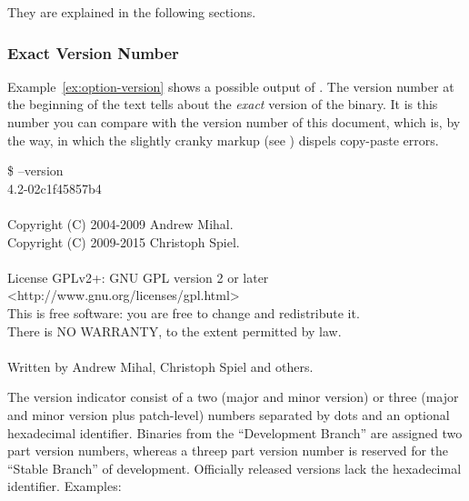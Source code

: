 \noindent They are explained in the following sections.

\subsubsection[Exact Version]{Exact Version Number
  \label{sec:exact-version}
  }

Example~\ref{ex:option-version} shows a possible output of
.  The version number at the beginning of the
text tells about the \emph{exact} version of the binary.  It is this
number you can compare with the version number of this document, which
is, by the way,  in which the slightly cranky markup
(see ) dispels copy-paste errors.

\begin{exemplar}[htbp]
  \centering
  \begin{terminal}
    \$ \app{} --version \\
    \app{} 4.2-02c1f45857b4 \\
    ~ \\
    Copyright (C) 2004-2009 Andrew Mihal. \\
    Copyright (C) 2009-2015 Christoph Spiel. \\
    ~ \\
    License GPLv2+: GNU GPL version 2 or later <http://www.gnu.org/licenses/gpl.html> \\
    This is free software: you are free to change and redistribute it. \\
    There is NO WARRANTY, to the extent permitted by law. \\
    ~ \\
    Written by Andrew Mihal, Christoph Spiel and others.
  \end{terminal}

  \caption[Output of ]%
          {Example output of \appcmd{} when called with
            option~.\label{ex:option-version}}
\end{exemplar}

The version indicator consist of a two (major and minor version) or
three (major and minor version plus patch-level) numbers separated by
dots and an optional hexadecimal identifier.  Binaries from the
``Development Branch''%
 are assigned two part
version numbers, whereas a threep part version number is reserved for
the ``Stable Branch''%
 of development.  Officially
released versions lack the hexadecimal identifier.  Examples:

